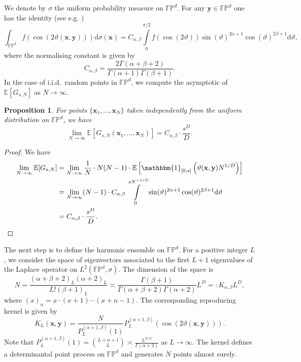 \documentclass[a4paper,11pt]{amsart}
\newtheorem{prop}{Proposition}
\begin{document}
We denote by $\sigma$ the uniform probability measure on $\mathbb{FP}^d$. For any $\mathbf{y}\in \mathbb{{FP}}^d$ one has the identity (see e.g. \cite{Brauchart2024})
\begin{equation}\label{zonal integral}
    \int_{\mathbb{FP}^d}f\left(\cos (2\vartheta(\mathbf{x},\mathbf{y}))\right)\mathrm{d}\sigma(\mathbf{x})=C_{\alpha,\beta}\int\limits_0^{\pi/2}f(\cos(2\vartheta))\sin(\vartheta)^{2\alpha+1}\cos (\vartheta)^{2\beta+1}\mathrm{d}\vartheta,
\end{equation}
where the normalising constant is given by 
$$C_{\alpha,\beta}=\frac{2\Gamma(\alpha+\beta+2)}{\Gamma(\alpha+1)\Gamma(\beta+1)}.$$
In the case of i.i.d.\ random points in $\mathbb{FP}^d$, we compute the asymptotic of $\mathbb{E}[G_{s,N}] $ as $N\rightarrow\infty$.
\begin{prop}\label{iid proposition projective}
 For points $\{\mathbf{x}_1,\dots,\mathbf{x}_N\}$ taken independently from the uniform distribution on $\mathbb{FP}^d$, we have 
\begin{equation}\label{iid asymptotic}
     \lim\limits_{N\rightarrow\infty}\mathbb{E}[G_{s,N}(\mathbf{x}_1,\dots,\mathbf{x}_N)]=C_{\alpha,\beta}\cdot\frac{s^D}{D}.
\end{equation}
\end{prop}
\begin{proof}
We have
\begin{align*}
       \lim\limits_{N\rightarrow\infty}\mathbb{E}[G_{s,N}]  &=\lim\limits_{N\rightarrow\infty}\frac{1}{N}\cdot N(N-1)\cdot \mathbb{E}\left[\mathbbm{1}_{[0,s]}\left(\vartheta(\mathbf{x},\mathbf{y})N^{1/D}\right)\right]
       \\ &=\lim_{N\rightarrow\infty}(N-1)\cdot C_{\alpha,\beta}\int\limits_{0}^{sN^{-1/D}}\sin(\vartheta)^{2\alpha+1}\cos (\vartheta)^{2\beta+1}\mathrm{d}\vartheta
    \\ &=C_{\alpha,\beta}\cdot\frac{s^D}{D}.
    \end{align*}
\end{proof}
The next step is to define the harmonic ensemble on $\mathbb{FP}^d$. For a positive integer $L$, we consider the space of eigenvectors associated to the first $L+1$ eigenvalues of the Laplace operator on $L^2(\mathbb{FP}^d,\sigma)$. The dimension of the space is 
$$N=\frac{(\alpha+\beta+2)_L(\alpha+2)_L}{L!(\beta+1)_L}\asymp\frac{\Gamma(\beta+1)}{\Gamma(\alpha+\beta+2)\Gamma(\alpha+2)}L^D=:K_{\alpha,\beta}L^D,$$
where $(x)_n=x\cdot (x+1)\cdots (x+n-1)$.
The corresponding reproducing kernel is given by
$$K_L(\mathbf{x},\mathbf{y})=\frac{N}{P_L^{(\alpha+1,\beta)}(1)}P_L^{(\alpha+1,\beta)}(\cos(2\vartheta(\mathbf{x},\mathbf{y}))).$$
Note that $P_L^{(\alpha+1,\beta)}(1)=\binom{L+\alpha+1}{L}\asymp \frac{L^{D/2}}{\Gamma(\alpha+2)}$ as $L\rightarrow\infty$. The kernel defines a determinantal point process on $\mathbb{FP}^d$ and generates $N$ points almost surely.
\end{document}
